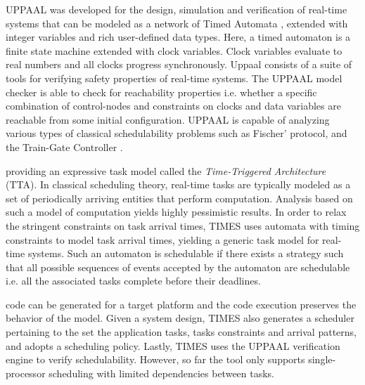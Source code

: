 UPPAAL \cite{larsen1997uppaal, bengtsson1996uppaal, david2009model} was
developed for the design, simulation and verification of real-time systems that
can be modeled as a network of Timed Automata \cite{Alur1994}, extended with
integer variables and rich user-defined data types. Here, a timed automaton is a
finite state machine extended with clock variables. Clock variables evaluate to
real numbers and all clocks progress synchronously. Uppaal consists of a suite
of tools for verifying safety properties of real-time systems. The UPPAAL model
checker is able to check for reachability properties i.e. whether a specific
combination of control-nodes and constraints on clocks and data variables are
reachable from some initial configuration. UPPAAL is capable of analyzing
various types of classical schedulability problems such as Fischer' protocol,
and the Train-Gate Controller \cite{bengtsson1996uppaal}.


providing an expressive task model called the \emph{Time-Triggered Architecture}
(TTA). In classical scheduling theory, real-time tasks are typically modeled as
a set of periodically arriving entities that perform computation. Analysis based
on such a model of computation yields highly pessimistic results. In order to
relax the stringent constraints on task arrival times, TIMES uses automata with
timing constraints to model task arrival times, yielding a generic task model
for real-time systems. Such an automaton is schedulable if there exists a
strategy such that all possible sequences of events accepted by the automaton
are schedulable i.e. all the associated tasks complete before their deadlines.

code can be generated for a target platform and the code execution preserves the
behavior of the model. Given a system design, TIMES also generates a scheduler
pertaining to the set the application tasks, tasks constraints and arrival
patterns, and adopts a scheduling policy. Lastly, TIMES uses the UPPAAL
verification engine to verify schedulability. However, so far the tool only
supports single-processor scheduling with limited dependencies between tasks.

\fi

